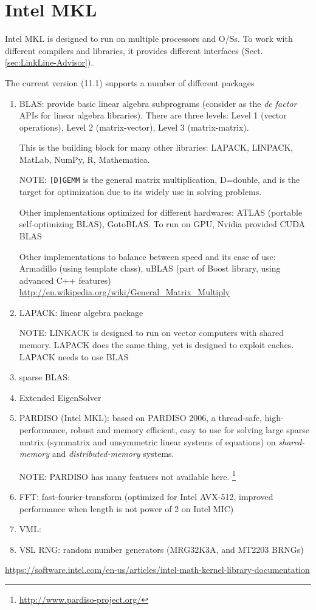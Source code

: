 \chapter{Intel MKL}
\label{chap:Intel_MKL}

Intel MKL is designed to run on multiple processors and O/Ss. To work with
different compilers and libraries, it provides different interfaces
(Sect.\ref{sec:LinkLine-Advisor}).

The current version (11.1) supports a number of different packages
\begin{enumerate}
  \item BLAS: provide basic linear algebra subprograms (consider as the {\it
  de factor } APIs for linear algebra libraries). There are three levels: Level
  1 (vector operations), Level 2 (matrix-vector), Level 3 (matrix-matrix).
  
This is the building block for many other libraries: LAPACK, LINPACK, MatLab,
NumPy, R, Mathematica.
  
NOTE: \verb![D]GEMM! is the general matrix multiplication, D=double, and is
the target for optimization due to its widely use in solving problems. 

Other implementations optimized for different hardwares: ATLAS (portable
self-optimizing BLAS), GotoBLAS. To run on GPU, Nvidia provided CUDA BLAS

Other implementations to balance between speed and its ease of use: Armadillo
(using template class), uBLAS (part of Boost library, using advanced C++
features) \url{http://en.wikipedia.org/wiki/General_Matrix_Multiply}




  \item LAPACK: linear algebra package 

NOTE: LINKACK is designed to run on vector computers with shared memory. LAPACK
does the same thing, yet is designed to exploit caches. LAPACK needs to use BLAS

  \item sparse BLAS: 
  \item Extended EigenSolver
  \item PARDISO (Intel MKL): based on PARDISO 2006, a thread-safe,
  high-performance, robust and memory efficient, easy to use for solving large
  sparse matrix (symmatrix and unsymmetric linear systems of equations) on {\it
  shared-memory} and {\it distributed-memory} systems.
  
NOTE: PARDISO has many featuers not available here.
\footnote{\url{http://www.pardiso-project.org/}}
  
  \item FFT: fast-fourier-transform (optimized for Intel AVX-512, improved
  performance when length is not power of 2 on Intel MIC)
  
  \item VML:
  \item VSL RNG: random number generators (MRG32K3A, and MT2203 BRNGs)
\end{enumerate}
\url{https://software.intel.com/en-us/articles/intel-math-kernel-library-documentation}

